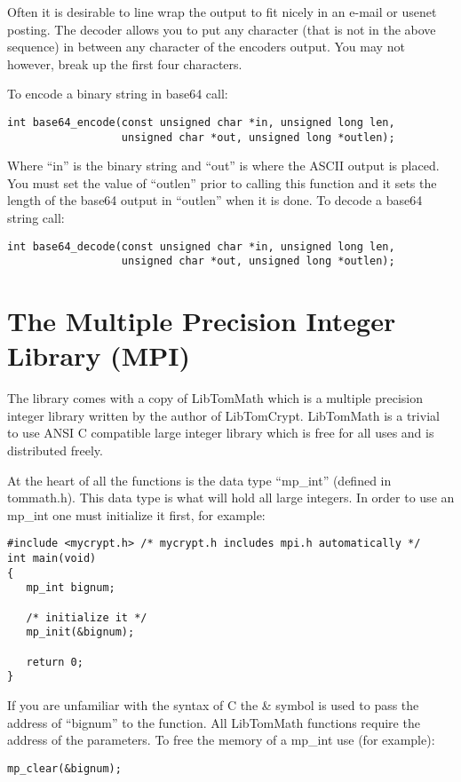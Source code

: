 \documentclass[b5paper]{book}
\begin{document}
Often it is desirable to line wrap the output to fit nicely in an e-mail or usenet posting.  The decoder allows you to
put any character (that is not in the above sequence) in between any character of the encoders output.  You may not however,
break up the first four characters.

To encode a binary string in base64 call:
   
\begin{verbatim}
int base64_encode(const unsigned char *in, unsigned long len, 
                  unsigned char *out, unsigned long *outlen);
\end{verbatim}
Where ``in'' is the binary string and ``out'' is where the ASCII output is placed.  You must set the value of ``outlen'' prior
to calling this function and it sets the length of the base64 output in ``outlen'' when it is done.  To decode a base64 
string call:
\begin{verbatim}
int base64_decode(const unsigned char *in, unsigned long len, 
                  unsigned char *out, unsigned long *outlen);
\end{verbatim}

\section{The Multiple Precision Integer Library (MPI)}
The library comes with a copy of LibTomMath  which is a multiple precision integer library written by the
author of LibTomCrypt.  LibTomMath is a trivial to use ANSI C compatible large integer library which is free 
for all uses and is distributed freely.

At the heart of all the functions is the data type ``mp\_int'' (defined in tommath.h).  This data type is what 
will hold all large integers.  In order to use an mp\_int one must initialize it first, for example:
\begin{verbatim}
#include <mycrypt.h> /* mycrypt.h includes mpi.h automatically */
int main(void)
{ 
   mp_int bignum;
   
   /* initialize it */
   mp_init(&bignum);

   return 0;
}
\end{verbatim}
If you are unfamiliar with the syntax of C the \& symbol is used to pass the address of ``bignum'' to the function.  All
LibTomMath functions require the address of the parameters.  To free the memory of a mp\_int use (for example):
\begin{verbatim}
mp_clear(&bignum);
\end{verbatim}
\end{document}
